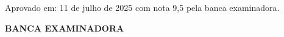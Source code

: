 \begin{folhadeaprovacao}

  \begin{center}
  \vspace*{-1.2cm}
    {\imprimirautor}

    \vspace*{\fill}
    {\textbf{\imprimirtitulo}}
    \vspace*{\fill}
    
    \hspace{.45\textwidth}
    \begin{minipage}{.5\textwidth}
        \imprimirpreambulo
    \end{minipage}%
    \vspace*{\fill}
   \end{center}
    
  \begin{flushleft}
  	 Aprovado em: 11 de julho de 2025 com nota 9,5 pela banca examinadora.
  \end{flushleft}
  \begin{center}
  \vspace*{2 cm}
  \textbf{BANCA EXAMINADORA}



\vspace*{\fill}

{\imprimirlocal}
\par
{\imprimirdata}
 \vspace*{-0.7cm}
 
 \end{center}
\end{folhadeaprovacao}